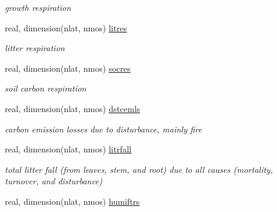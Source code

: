 \begin{DoxyCompactItemize}
\begin{DoxyCompactList}\small\item\em growth respiration \end{DoxyCompactList}\item 
\hypertarget{structctem__statevars_1_1veg__rot_aa54e0702f6387c73e1f0abf3d2740569}{}real, dimension(nlat, nmos) \hyperlink{structctem__statevars_1_1veg__rot_aa54e0702f6387c73e1f0abf3d2740569}{litres}\label{structctem__statevars_1_1veg__rot_aa54e0702f6387c73e1f0abf3d2740569}

\begin{DoxyCompactList}\small\item\em litter respiration \end{DoxyCompactList}\item 
\hypertarget{structctem__statevars_1_1veg__rot_a361e3f2a91d8f8796d1ce582e7a7c254}{}real, dimension(nlat, nmos) \hyperlink{structctem__statevars_1_1veg__rot_a361e3f2a91d8f8796d1ce582e7a7c254}{socres}\label{structctem__statevars_1_1veg__rot_a361e3f2a91d8f8796d1ce582e7a7c254}

\begin{DoxyCompactList}\small\item\em soil carbon respiration \end{DoxyCompactList}\item 
\hypertarget{structctem__statevars_1_1veg__rot_a00d303fa189ac335f5c69b68e78cf943}{}real, dimension(nlat, nmos) \hyperlink{structctem__statevars_1_1veg__rot_a00d303fa189ac335f5c69b68e78cf943}{dstcemls}\label{structctem__statevars_1_1veg__rot_a00d303fa189ac335f5c69b68e78cf943}

\begin{DoxyCompactList}\small\item\em carbon emission losses due to disturbance, mainly fire \end{DoxyCompactList}\item 
\hypertarget{structctem__statevars_1_1veg__rot_a96619bdf1c5a1ecbdf7d22adcf38115f}{}real, dimension(nlat, nmos) \hyperlink{structctem__statevars_1_1veg__rot_a96619bdf1c5a1ecbdf7d22adcf38115f}{litrfall}\label{structctem__statevars_1_1veg__rot_a96619bdf1c5a1ecbdf7d22adcf38115f}

\begin{DoxyCompactList}\small\item\em total litter fall (from leaves, stem, and root) due to all causes (mortality, turnover, and disturbance) \end{DoxyCompactList}\item 
\hypertarget{structctem__statevars_1_1veg__rot_adb3abe4e09d70e283fe248b56eb1db6d}{}real, dimension(nlat, nmos) \hyperlink{structctem__statevars_1_1veg__rot_adb3abe4e09d70e283fe248b56eb1db6d}{humiftrs}\label{structctem__statevars_1_1veg__rot_adb3abe4e09d70e283fe248b56eb1db6d}


\end{DoxyCompactItemize}
